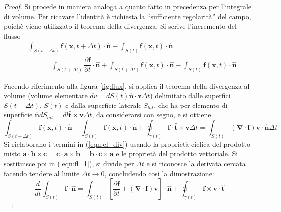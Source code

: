 \begin{proof}
Si procede in maniera analoga a quanto fatto in precedenza per l'integrale di volume. Per ricavare l'identità è richiesta
 la ``sufficiente regolarità'' del campo, poichè viene utilizzato il teorema della divergenza. Si scrive l'incremento
 del flusso
\begin{equation}
\begin{aligned}
  & \int_{S(t+\Delta t)} \bm{f}(\bm{x},t + \Delta t) \cdot \bm{\hat{n}} -   \int_{S(t)} \bm{f}(\bm{x},t) \cdot \bm{\hat{n}} = \\
  & \qquad  =  \int_{S(t+\Delta t)} \dfrac{\partial \bm{f}}{\partial t} \cdot \bm{\hat{n}} + \int_{S(t+\Delta t)} \bm{f}(\bm{x},t) \cdot \bm{\hat{n}}
   -   \int_{S(t)} \bm{f}(\bm{x},t)  \cdot \bm{\hat{n}}
\end{aligned}
\label{eqn:fl_1}
\end{equation}

Facendo riferimento alla figura \ref{fig:flux}, si applica
 il teorema della divergenza al volume (volume elementare $dv = dS(t) \bm{\hat{n}} \cdot \bm{v} \Delta t$)
 delimitato dalle superfici $S(t+\Delta t)$, $S(t)$ e dalla superficie laterale $S_{lat}$,
 che ha per elemento di superficie $\bm{\hat{n}}d S_{lat} = dl \bm{\hat{t}} \times \bm{v} \Delta t$, da considerarsi con segno, e si ottiene
\begin{equation}
  \int_{S(t+\Delta t)} \bm{f}(\bm{x},t) \cdot \bm{\hat{n}}
   -   \int_{S(t)} \bm{f}(\bm{x},t)  \cdot \bm{\hat{n}} + \oint_{\gamma(t)} \bm{f} \cdot \bm{\hat{t}} \times \bm{v} \Delta t =
  \int_{S(t)} (\bm{\nabla} \cdot \bm{f}) \bm{v} \cdot \bm{\hat{n}} \Delta t
\label{eqn:el_div}
\end{equation}
Si rielaborano i termini in (\ref{eqn:el_div}) usando la proprietà ciclica del prodotto misto
 $\bm{a} \cdot \bm{b}\times\bm{c} = \bm{c} \cdot \bm{a}\times\bm{b} = 
 \bm{b} \cdot \bm{c}\times\bm{a}$ e le proprietà del prodotto vettoriale. Si sostituisce poi in (\ref{eqn:fl_1}), si divide per $\Delta t$ e 
 si riconosce la derivata cercata facendo tendere al limite $\Delta t \rightarrow 0$, concludendo così la dimostrazione:
 \begin{equation}
   \frac{d}{dt}\int_{S(t)} \bm{f}\cdot{\bm{\hat{n}}} = 
  \int_{S(t)} \left[\frac{\partial \bm{f}}{\partial t} +
  (\bm{\nabla}\cdot\bm{f}) \bm{v} \right] \cdot{\bm{\hat{n}}}  + 
  \oint_{\gamma(t)} \bm{f} \times \bm{v} \cdot \bm{\hat{t}}
 \end{equation}
\end{proof}

